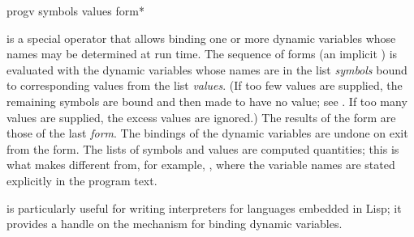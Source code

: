 \begin{defspec}
progv symbols values {form}*

 is a special operator that allows binding one or more dynamic
variables whose names may be determined at run time.  The sequence of
forms (an implicit )
is evaluated with the dynamic variables whose names are in the list
\emph{symbols} bound to corresponding values from the list \emph{values}.
(If too few values are supplied, the remaining symbols are bound and then
made to have no value; see .  If too many values are
supplied, the excess values are ignored.)  The results of the 
form are those of the last
\emph{form}.  The bindings of the dynamic variables are undone on
exit from the  form.  The lists of symbols and values are
computed quantities; this is what makes  different from, for
example, , where the variable names are stated explicitly in
the program text.

 is particularly useful for writing interpreters for languages
embedded in Lisp; it provides a handle on the mechanism for binding
dynamic variables.
\end{defspec}

